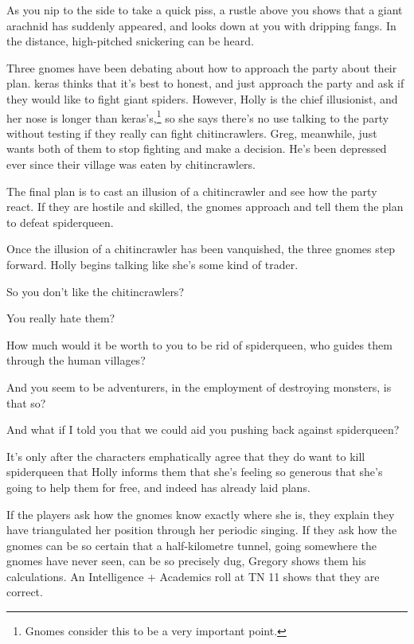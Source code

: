 \begin{multicols}{2}
\begin{boxtext}

	As you nip to the side to take a quick piss, a rustle above you shows that a giant arachnid has suddenly appeared, and looks down at you with dripping fangs.  In the distance, high-pitched snickering can be heard.

\end{boxtext}

Three gnomes have been debating about how to approach the party about their plan.
\Gls{keras} thinks that it's best to honest, and just approach the party and ask if they would like to fight giant spiders.
However, Holly is the chief illusionist, and her nose is longer than \gls{keras}'s,\footnote{Gnomes consider this to be a very important point.} so she says there's no use talking to the party without testing if they really can fight chitincrawlers.
Greg, meanwhile, just wants both of them to stop fighting and make a decision.
He's been depressed ever since their village was eaten by chitincrawlers.

The final plan is to cast an illusion of a chitincrawler and see how the party react.  If they are hostile and skilled, the gnomes approach and tell them the plan to defeat \gls{spiderqueen}.

Once the illusion of a chitincrawler has been vanquished, the three gnomes step forward.
Holly begins talking like she's some kind of trader.

\begin{speechtext}

	So you don't like the chitincrawlers?

	You really hate them?

	How much would it be worth to you to be rid of \gls{spiderqueen}, who guides them through the human villages?

	And you seem to be adventurers, in the employment of destroying monsters, is that so?

	And what if I told you that we could aid you pushing back against \gls{spiderqueen}?

\end{speechtext}

It's only after the characters emphatically agree that they do want to kill \gls{spiderqueen} that Holly informs them that she's feeling so generous that she's going to help them for free, and indeed has already laid plans.

If the players ask how the gnomes know exactly where she is, they explain they have triangulated her position through her periodic singing.
If they ask how the gnomes can be so certain that a half-kilometre tunnel, going somewhere the gnomes have never seen, can be so precisely dug, Gregory shows them his calculations.
An Intelligence + Academics roll at TN 11 shows that they are correct.


\end{multicols}
